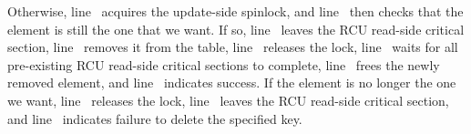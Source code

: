 \begin{fcvref}
Otherwise, line~ acquires the update-side spinlock, and
line~ then checks that the element is still the one that we want.
If so, line~ leaves the RCU read-side critical section,
line~ removes it from the table, line~ releases
the lock, line~ waits for all pre-existing RCU read-side critical
sections to complete, line~ frees the newly removed element,
and line~ indicates success.
If the element is no longer the one we want, line~ releases
the lock, line~ leaves the RCU read-side critical section,
and line~ indicates failure to delete the specified key.
\end{fcvref}

